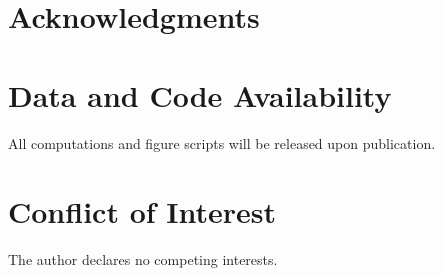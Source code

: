 \documentclass[11pt,a4paper]{article}
\begin{document}

\section*{Acknowledgments}



\section*{Data and Code Availability}

All computations and figure scripts will be released upon publication.


\section*{Conflict of Interest}

The author declares no competing interests.








\end{document}
